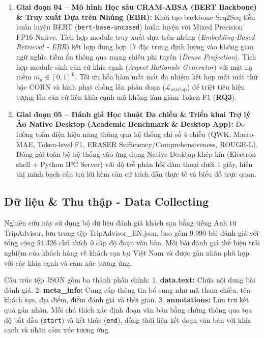 \documentclass[pdflatex,sn-mathphys-num]{sn-jnl}
\theoremstyle{thmstyleone}
\theoremstyle{thmstyletwo}
\theoremstyle{thmstylethree}
\begin{document}
\begin{enumerate}
    \item \textbf{Giai đoạn 04 -- Mô hình Học sâu CRAM-ABSA (BERT Backbone) \& Truy xuất Dựa trên Nhúng (EBR):} Khởi tạo backbone Seq2Seq tiền huấn luyện BERT (\texttt{bert-base-uncased}) huấn luyện với Mixed Precision FP16 Native. Tích hợp module truy xuất dựa trên nhúng (\textit{Embedding-Based Retrieval - EBR}) kết hợp dung hợp 17 đặc trưng định lượng vào không gian ngữ nghĩa tiềm ẩn thông qua mạng chiếu phi tuyến (\textit{Dense Projection}). Tích hợp module sinh căn cứ khía cạnh (\textit{Aspect Rationale Generator}) với mặt nạ mềm $m_a \in [0, 1]^L$. Tối ưu hóa hàm mất mát đa nhiệm kết hợp mất mát thứ bậc CORN và hình phạt chồng lấn phân đoạn ($\mathcal{L}_{\text{overlap}}$) để triệt tiêu hiện tượng lẫn căn cứ liên khía cạnh mà không làm giảm Token-F1 (\textbf{RQ3}).
    
    \item \textbf{Giai đoạn 05 -- Đánh giá Học thuật Đa chiều \& Triển khai Trợ lý Ảo Native Desktop (Academic Benchmark \& Desktop App):} Đo lường toàn diện hiệu năng thông qua hệ thống chỉ số 4 chiều (QWK, Macro-MAE, Token-level F1, ERASER Sufficiency/Comprehensiveness, ROUGE-L). Đóng gói toàn bộ hệ thống vào ứng dụng Native Desktop khép kín (Electron shell + Python IPC Server) với độ trễ phản hồi đàm thoại dưới 1 giây, hiển thị minh bạch câu trả lời kèm căn cứ trích dẫn thực tế và biểu đồ trực quan.
\end{enumerate}

\subsection{Dữ liệu \& Thu thập - Data Collecting}
\label{subsec:datacollecting}

Nghiên cứu này sử dụng bộ dữ liệu đánh giá khách sạn bằng tiếng Anh từ TripAdvisor, lưu trong tệp TripAdvisor\_EN.json, bao gồm 9.990 bài đánh giá với tổng cộng 54.326 chú thích ở cấp độ đoạn văn bản. Mỗi bài đánh giá thể hiện trải nghiệm của khách hàng về khách sạn tại Việt Nam và được gán nhãn phù hợp với các khía cạnh và cảm xúc tương ứng.

Cấu trúc tệp JSON gồm ba thành phần chính: 
1. \textbf{data.text:} Chứa nội dung bài đánh giá.
2. \textbf{meta\_info:} Cung cấp thông tin bổ sung như mã tham chiếu, tên khách sạn, địa điểm, điểm đánh giá và thời gian.
3. \textbf{annotations:} Lưu trữ kết quả gán nhãn. Mỗi chú thích xác định đoạn văn bản bằng chứng thông qua tọa độ bắt đầu (\texttt{start}) và kết thúc (\texttt{end}), đồng thời liên kết đoạn văn bản với khía cạnh và nhãn cảm xúc tương ứng.
\end{document}
